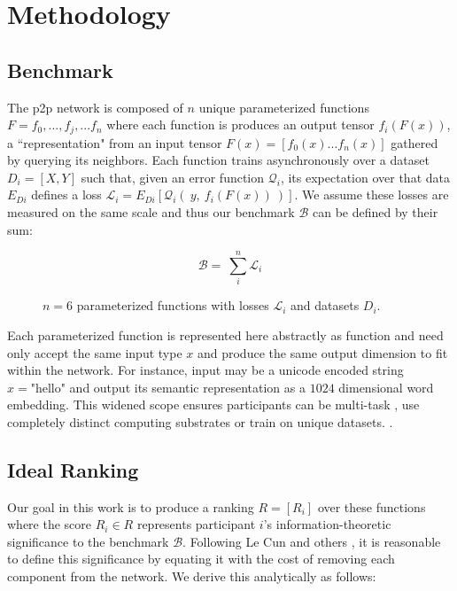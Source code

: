 \documentclass{article}
\begin{document}
\section{Methodology}
\label{methodology}
\subsection{Benchmark}

The p2p network is composed of $n$ unique parameterized functions $F = {f_0, ...,  f_j, ...f_n}$ where each function is produces an output tensor $f_i(F(x))$, a ``representation" from an input tensor $F(x) = [f_0{(x)} ... f_n{(x)}]$ gathered by querying its neighbors. Each function trains asynchronously over a dataset $D_i=[X,Y]$ such that, given an error function $\mathcal{Q}_i$, its expectation over that data $E_{Di}$ defines a loss $\mathcal{L}_i = E_{Di}[\mathcal{Q}_i( \ y, \ f_i(F(x)) \ )]$. We assume these losses are measured on the same scale and thus our benchmark $\mathcal{B}$ can be defined by their sum:

\begin{equation}
\mathcal{B} = \ \sum_{i}^{n} \mathcal{L}_i 
\end{equation}

\begin{figure}[H]
	\centering
	\hspace*{-2cm}
	
	\caption{$n=6$ parameterized functions with losses $\mathcal{L}_i$ and datasets $D_i$.}
\end{figure}{}

Each parameterized function is represented here abstractly as function \cite{hinton2015distilling} and need only accept the same input type $x$ and produce the same output dimension to fit within the network. For instance, input may be a unicode encoded string $x = \text{"hello"}$ and output its semantic representation as a $1024$ dimensional word embedding. This widened scope ensures participants can be multi-task \cite{kaiser2017model}, use completely distinct computing substrates \cite{alex2014cortical} or train on unique datasets. \cite{lample2019crosslingual}. 

\subsection{Ideal Ranking}

Our goal in this work is to produce a ranking $R = [R_i]$ over these functions where the score $R_i \in R$ represents participant $i$'s information-theoretic significance to the benchmark $\mathcal{B}$. Following Le Cun and others \cite{lecun1989optimalbraindamage,yu2017nisp}, it is reasonable to define this significance by equating it with the cost of removing each component from the network. We derive this analytically as follows:
\end{document}
